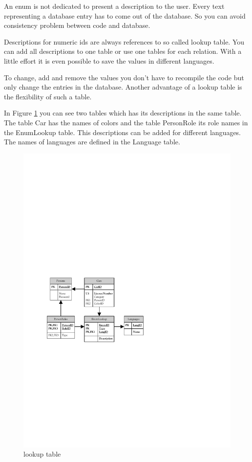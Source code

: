 		An enum is not dedicated to present a description to the user. Every text 
		representing a database entry has to come out of the database. So you can 
		avoid consistency problem between code and database.
		
		Descriptions for numeric ids are always references to so called lookup 
		table. You can add all descriptions to one table or use one tables for each 
		relation. With a little effort it is even possible to save the values in 
		different languages.
				
		To change, add and remove the values you don't have to recompile the code 
		but only change the entries in the database. Another advantage of a lookup 
		table is the flexibility of such a table. 
		
		In Figure \ref{fig:AnalysisEnumExtended} you can see two tables which has 
		its descriptions in the same table. The table Car has the names of colors 
		and the table PersonRole its role names in the EnumLookup table. This 
		descriptions can be added for different languages. The names of languages 
		are defined in the Language table.
		
		\begin{figure}[hbt]
			\begin{center}
				\includegraphics{./files/inc/figures/AnalysisEnumExtended}
				\caption{\label{fig:AnalysisEnumExtended} lookup table}
			\end{center}
		\end{figure}
		
